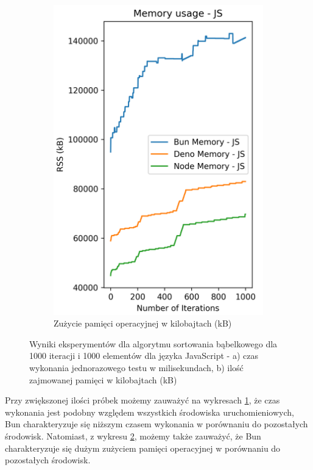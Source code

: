 \begin{figure}[H]
\begin{subfigure}[b]{0.44\textwidth}
    \label{fig:bubble_sorting_e2_time}
  \end{subfigure}
  \begin{subfigure}[b]{0.44\textwidth}
    \centering
    \includegraphics[width=\textwidth]{Figures/sorting/sorting_bubble_1000_1000_js_memory.png}
    \caption{Zużycie pamięci operacyjnej w kilobajtach (kB)}
    \label{fig:bubble_sorting_e2_memory}
  \end{subfigure}
  \caption{Wyniki eksperymentów dla algorytmu sortowania bąbelkowego dla 1000 iteracji i 1000 elementów dla języka JavaScript - a) czas wykonania jednorazowego testu w milisekundach, b) ilość zajmowanej pamięci w kilobajtach (kB)}
  \label{fig:bubble_sorting_e2}
\end{figure}

Przy zwiększonej ilości próbek możemy zauważyć na wykresach \ref{fig:bubble_sorting_e2_time}, że czas wykonania jest podobny względem wszystkich środowiska uruchomieniowych, Bun charakteryzuje się niższym czasem wykonania w porównaniu do pozostałych środowisk. Natomiast, z wykresu \ref{fig:bubble_sorting_e2_memory}, możemy także zauważyć, że Bun charakteryzuje się dużym zużyciem pamięci operacyjnej w porównaniu do pozostałych środowisk.

